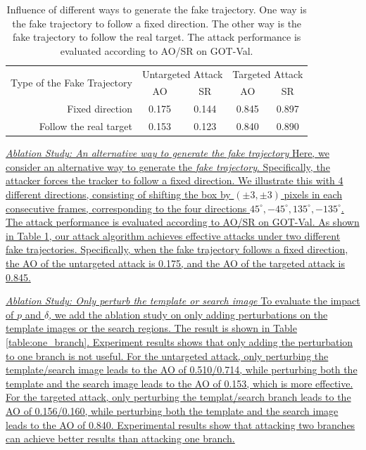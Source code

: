 \documentclass[journal]{IEEEtran}
\begin{document}
\begin{table}[t]
  \centering
  \caption{Influence of different ways to generate the fake trajectory. One way is the fake trajectory to follow a fixed direction. The other way is the fake trajectory to follow the real target. The attack performance is evaluated according to AO/SR on GOT-Val.}
  \begin{tabular}{@{}rcccc@{}}
  \toprule
  \multirow{2}{*}[-2pt]{Type of the Fake Trajectory} & \multicolumn{2}{c}{Untargeted Attack} & \multicolumn{2}{c}{Targeted Attack} \\ \cmidrule{2-5}
                              & AO                & SR                & AO               & SR               \\ \midrule
  Fixed direction             & 0.175             & 0.144             & 0.845            & 0.897            \\
  Follow the real target      & 0.153             & 0.123             & 0.840            & 0.890            \\ \bottomrule        
  \end{tabular}
  \label{table:direction}
\end{table}
\uline{\textit{Ablation Study: An alternative way to generate the fake} 
\textit{trajectory}
Here, we consider an alternative way to generate the \textit{fake trajectory}. Specifically, the attacker forces the tracker to follow a fixed direction. We illustrate this with 4 different directions, consisting of shifting the box by $(\pm 3, \pm 3)$ pixels in each consecutive frames, corresponding to the four directions $45^{\circ}, -45^{\circ}, 135^{\circ}, -135^{\circ}$.
The attack performance is evaluated according to AO/SR on GOT-Val.
As shown in Table \ref{table:direction}, our attack algorithm achieves effective attacks under two different fake trajectories. Specifically, when the fake trajectory follows a fixed direction, the AO of the untargeted attack is 0.175, and the AO of the targeted attack is 0.845.}

\uline{\textit{Ablation Study: Only perturb the template or search image} To evaluate the impact of $p$ and $\delta$, we add the ablation study on only adding perturbations on the template images or the search regions. The result is shown in Table \ref{table:one_branch}. Experiment results shows that only adding the perturbation to one branch is not useful.
For the untargeted attack, only perturbing the template/search image leads to the AO of 0.510/0.714, while perturbing both the template and the search image leads to the AO of 0.153, which is more effective.
For the targeted attack, only perturbing the templat/search branch leads to the AO of 0.156/0.160, while perturbing both the template and the search image leads to the AO of 0.840. Experimental results show that attacking two branches can achieve better results than attacking one branch.}
\end{document}
